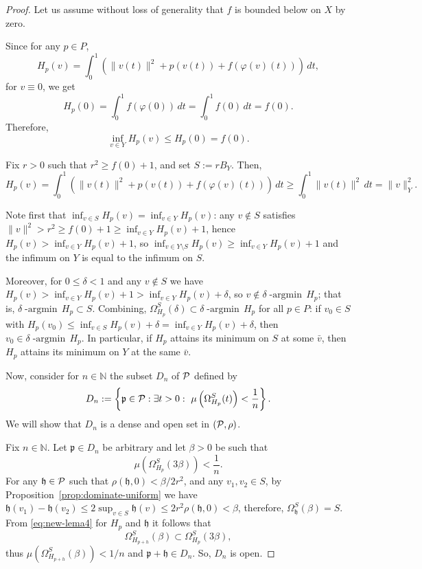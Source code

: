 \documentclass[12pt,leqno]{article}
\theoremstyle{definition}
\theoremstyle{remark}
\def\ds{\displaystyle}
\def\N{\mathbb{N}}
\def\eps{\varepsilon}
\DeclareMathOperator*{\argmin}{-argmin\,}
\begin{document}
\begin{proof}
Let us assume without loss of generality  that $f $ is bounded below on  $X$ by zero.

Since for any $p\in P$,
\[
H_p(v)=\int_0^1 (\|v(t)\|^2 +p(v(t)) +f(\varphi(v)(t)))\, dt,
\]
for $v \equiv 0$, we get
\[
H_p(0)=\int_0^1  f(\varphi(0))\, dt= \int_0^1  f(0)\, dt =f(0).
\]
Therefore,
\[
\inf_{v\in Y} H_p(v)\le H_p(0)=f(0).
\]

Fix $r>0$ such that $r^2\ge f(0)+1$, and set $S:=rB_Y$.
Then,
\begin{equation}\label{globmin}
H_p(v)=\int_0^1 (\|v(t)\|^2 +p(v(t)) +f(\varphi(v)(t)))\, dt \ge \int_0^1 \|v(t)\|^2 \, dt =\|v\|_Y^2.
\end{equation}

Note first that $\inf_{v\in S} H_p(v) = \inf_{v\in Y} H_p(v)$: any $v\not\in S$ satisfies $\|v\|^2>r^2\ge f(0)+1\ge \inf_{v\in Y}H_p(v)+1$, hence $H_p(v)>\inf_{v\in Y}H_p(v)+1$, so $\ds\inf_{v\in Y\setminus S} H_p(v) \ge \inf_{v\in Y} H_p(v)+1$ and the infimum on $Y$ is equal to the infimum on $S$.

Moreover, for $0\le \delta <1$ and any $v\not\in S$ we have $H_p(v)>\inf_{v\in Y}H_p(v)+1>\inf_{v\in Y}H_p(v)+\delta$, so $v\not\in \delta\argmin H_p$; that is, $\delta\argmin H_p\subset S$. Combining, $\Omega^S_{H_p}(\delta)\subset \delta\argmin H_p$ for all $p\in P$: if $v_0\in S$ with $H_p(v_0)\le \inf_{v\in S} H_p(v)+\delta = \inf_{v\in Y} H_p(v)+\delta$, then $v_0\in \delta\argmin H_p$. In particular, if $H_p$ attains its minimum on $S$ at some $\bar v$, then $H_p$ attains its minimum on $Y$ at the same $\bar v$.

 \smallskip

Now, consider for $n\in\N$ the subset $D_n$ of $\cal{P}$ defined by
$$
    D_n:=\left\{ \mathfrak{p}\in {\cal{P}}:  \exists t>0  :\ \mu\left(\Omega_{H_p}^S(t)\right) < \frac{1}{n}\right\}.
$$
We will show that $D_n$ is a dense and open set in $(\cal{P},\rho)$.

Fix $n\in\N$. Let $\mathfrak{p}\in D_n$ be arbitrary and let $\beta > 0$ be such that
$$
  \mu\left(\Omega_{H_p}^S(3\beta)\right) < \frac{1}{n}.
$$
For any $\mathfrak{h}\in  \cal{P}$  such that $\rho (\mathfrak{h},0)<\beta/2r^2$, and any $v_1,v_2\in S$, by Proposition~\ref{prop:dominate-uniform} we have
$\mathfrak{h}(v_1) - \mathfrak{h}(v_2) \le 2\sup_{v\in S} \mathfrak{h}(v) \le 2r^2\rho(\mathfrak{h},0)<\beta$, therefore, $\Omega_\mathfrak{h}^S(\beta) = S$. From \eqref{eq:new-lema4} for $H_p$ and $\mathfrak{h}$ it follows that
$$
  \Omega^S_{H_{p+h}}(\beta) \subset \Omega_{H_p}^S(3\beta),
$$
thus $\mu (\Omega^S_{H_{p+h}}(\beta)) < 1/n$ and $\mathfrak{p}+\mathfrak{h}\in D_n$. So, $D_n$ is open.


\end{proof}
\end{document}
